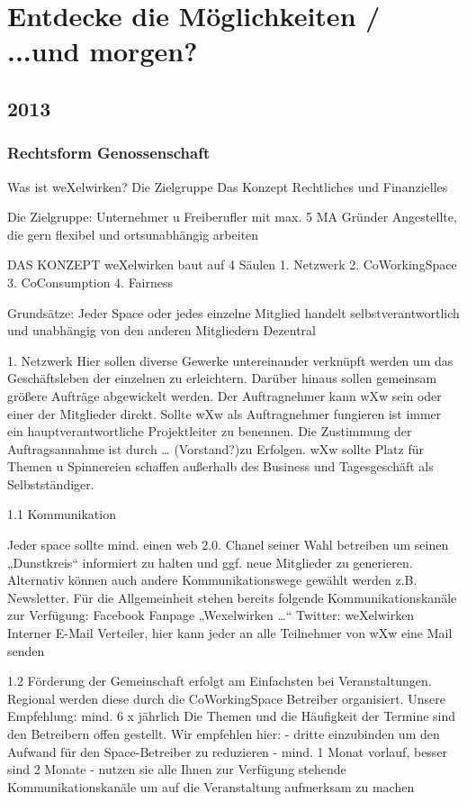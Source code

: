\chapter{Entdecke die Möglichkeiten / ...und morgen?}

  \section{2013}
\subsection{Rechtsform Genossenschaft}
Was ist weXelwirken?
Die Zielgruppe
Das Konzept
Rechtliches und Finanzielles

Die Zielgruppe:
Unternehmer u Freiberufler mit max. 5 MA
Gründer
Angestellte, die gern flexibel und ortsunabhängig arbeiten 


DAS KONZEPT
weXelwirken baut auf 4 Säulen
1. Netzwerk
2. CoWorkingSpace
3. CoConsumption 
4. Fairness 

Grundsätze:
Jeder Space oder jedes einzelne Mitglied handelt selbstverantwortlich und unabhängig von den anderen Mitgliedern
Dezentral



1. Netzwerk
Hier sollen diverse Gewerke untereinander verknüpft werden um das Geschäftsleben der einzelnen zu erleichtern. Darüber hinaus sollen gemeinsam größere Aufträge abgewickelt werden. Der Auftragnehmer kann wXw sein oder einer der Mitglieder direkt.
Sollte wXw als Auftragnehmer fungieren ist immer ein hauptverantwortliche Projektleiter zu benennen. Die Zustimmung der Auftragsannahme ist durch … (Vorstand?)zu Erfolgen.
wXw sollte Platz für Themen u Spinnereien schaffen außerhalb des Business und Tagesgeschäft als Selbstständiger.

1.1 Kommunikation 

Jeder space sollte mind. einen web 2.0. Chanel seiner Wahl betreiben um seinen „Dunstkreis“ informiert zu halten und ggf. neue Mitglieder zu generieren. Alternativ können auch andere Kommunikationswege gewählt werden z.B. Newsletter.
Für die Allgemeinheit stehen bereits folgende Kommunikationskanäle zur Verfügung:
Facebook Fanpage „Wexelwirken …“
Twitter: weXelwirken
Interner E-Mail Verteiler, hier kann jeder an alle Teilnehmer von wXw eine Mail senden 


1.2 Förderung der Gemeinschaft
erfolgt am Einfachsten bei Veranstaltungen. 
Regional werden diese durch die CoWorkingSpace Betreiber organisiert. Unsere Empfehlung: mind. 6 x jährlich 
Die Themen und die Häufigkeit der Termine sind den Betreibern offen gestellt. Wir empfehlen hier:
- dritte einzubinden um den Aufwand für den Space-Betreiber zu reduzieren
- mind. 1 Monat vorlauf, besser sind 2 Monate
- nutzen sie alle Ihnen zur Verfügung stehende Kommunikationskanäle um auf die Veranstaltung aufmerksam zu machen


